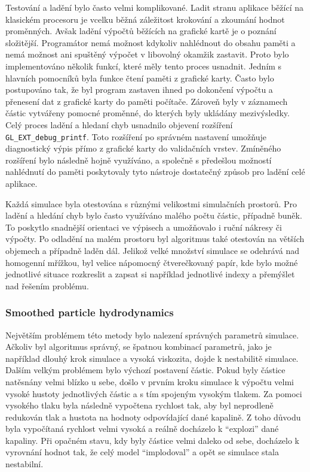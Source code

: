 Testování a ladění bylo často velmi komplikované. Ladit stranu aplikace běžící na klasickém procesoru je vcelku běžná záležitost krokování a zkoumání hodnot proměnných. Avšak ladění výpočtů běžících na grafické kartě je o poznání složitější. Programátor nemá možnost kdykoliv nahlédnout do obsahu paměti a nemá možnost ani spuštěný výpočet v libovolný okamžik zastavit. Proto bylo implementováno několik funkcí, které měly tento proces usnadnit. Jedním s hlavních pomocníků byla funkce čtení paměti z grafické karty. Často bylo postupováno tak, že byl program zastaven ihned po dokončení výpočtu a přenesení dat z grafické karty do paměti počítače. Zároveň byly v záznamech částic vytvářeny pomocné proměnné, do kterých byly ukládány mezivýsledky. Celý proces ladění a hledaní chyb usnadnilo objevení rozšíření \texttt{GL\_EXT\_debug\_printf}. Toto rozšíření po správném nastavení umožňuje diagnostický výpis přímo z grafické karty do validačních vrstev. Zmíněného rozšíření bylo následně hojně využíváno, a společně s předešlou možností nahlédnutí do paměti poskytovaly tyto nástroje dostatečný způsob pro ladění celé aplikace.

Každá simulace byla otestována s různými velikostmi simulačních prostorů. Pro ladění a hledání chyb bylo často využíváno malého počtu částic, případně buněk. To poskytlo snadnější orientaci ve výpisech a umožňovalo i ruční nákresy či výpočty. Po odladění na malém prostoru byl algoritmus také otestován na větších objemech a případně laděn dál. Jelikož velké množství simulace se odehrává nad homogenní mřížkou, byl velice nápomocný čtverečkovaný papír, kde bylo možné jednotlivé situace rozkreslit a zapsat si například jednotlivé indexy a přemýšlet nad řešením problému.

\subsubsection{Smoothed particle hydrodynamics}
Největším problémem této metody bylo nalezení správných parametrů simulace. Ačkoliv byl algoritmus správný, se špatnou kombinací parametrů, jako je například dlouhý krok simulace a vysoká viskozita, dojde k nestabilitě simulace. Dalším velkým problémem bylo výchozí postavení částic. Pokud byly částice natěsnány velmi blízko u sebe, došlo v prvním kroku simulace k výpočtu velmi vysoké hustoty jednotlivých částic a s tím spojeným vysokým tlakem. Za pomoci vysokého tlaku byla následně vypočtena rychlost tak, aby byl neprodleně redukován tlak a hustota na hodnoty odpovídající dané kapalině. Z toho důvodu byla vypočítaná rychlost velmi vysoká a reálně docházelo k \enquote{explozi} dané kapaliny. Při opačném stavu, kdy byly částice velmi daleko od sebe, docházelo k vyrovnání hodnot tak, že celý model \enquote{implodoval} a opět se simulace stala nestabilní.

